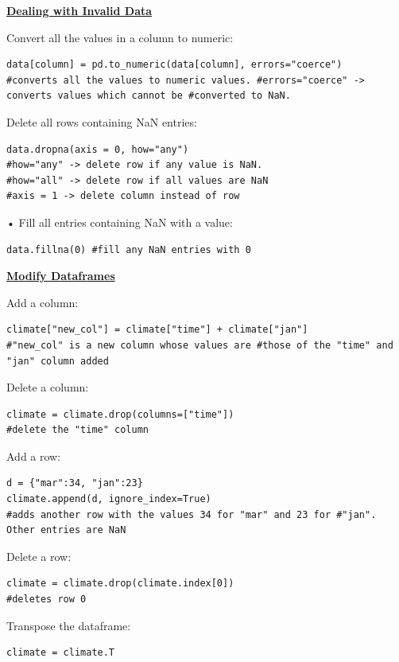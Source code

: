 {\centering\underline{\textbf{Dealing with Invalid Data}} \par}
Convert all the values in a column to numeric:
\begin{lstlisting}
data[column] = pd.to_numeric(data[column], errors="coerce")
#converts all the values to numeric values. #errors="coerce" -> converts values which cannot be #converted to NaN.
\end{lstlisting}
Delete all rows containing NaN entries:
\begin{lstlisting}
data.dropna(axis = 0, how="any")
#how="any" -> delete row if any value is NaN.
#how="all" -> delete row if all values are NaN
#axis = 1 -> delete column instead of row
\end{lstlisting}
• Fill all entries containing NaN with a value:
\begin{lstlisting}
data.fillna(0) #fill any NaN entries with 0
\end{lstlisting}

{\centering\underline{\textbf{Modify Dataframes}} \par}
Add a column:
\begin{lstlisting}
climate["new_col"] = climate["time"] + climate["jan"] 
#"new_col" is a new column whose values are #those of the "time" and "jan" column added
\end{lstlisting}
Delete a column:
\begin{lstlisting}
climate = climate.drop(columns=["time"])
#delete the "time" column
\end{lstlisting}
Add a row:
\begin{lstlisting}
d = {"mar":34, "jan":23}
climate.append(d, ignore_index=True)
#adds another row with the values 34 for "mar" and 23 for #"jan". Other entries are NaN
\end{lstlisting}
Delete a row:
\begin{lstlisting}
climate = climate.drop(climate.index[0]) 
#deletes row 0
\end{lstlisting}
Transpose the dataframe:
\begin{lstlisting}
climate = climate.T
\end{lstlisting}

